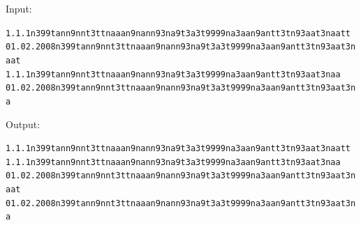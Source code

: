 Input:

{\footnotesize
\begin{alltt}
1.1.1       n399tann9nnt3ttnaaan9nann93na9t3a3t9999na3aan9antt3tn93aat3naatt
01.02.2008  n399tann9nnt3ttnaaan9nann93na9t3a3t9999na3aan9antt3tn93aat3naat
1.1.1       n399tann9nnt3ttnaaan9nann93na9t3a3t9999na3aan9antt3tn93aat3naa
01.02.2008  n399tann9nnt3ttnaaan9nann93na9t3a3t9999na3aan9antt3tn93aat3na
\end{alltt}
}

Output:

{\footnotesize
\begin{alltt}
1.1.1       n399tann9nnt3ttnaaan9nann93na9t3a3t9999na3aan9antt3tn93aat3naatt
1.1.1       n399tann9nnt3ttnaaan9nann93na9t3a3t9999na3aan9antt3tn93aat3naa
01.02.2008  n399tann9nnt3ttnaaan9nann93na9t3a3t9999na3aan9antt3tn93aat3naat
01.02.2008  n399tann9nnt3ttnaaan9nann93na9t3a3t9999na3aan9antt3tn93aat3na
\end{alltt}
}

\pagebreak
